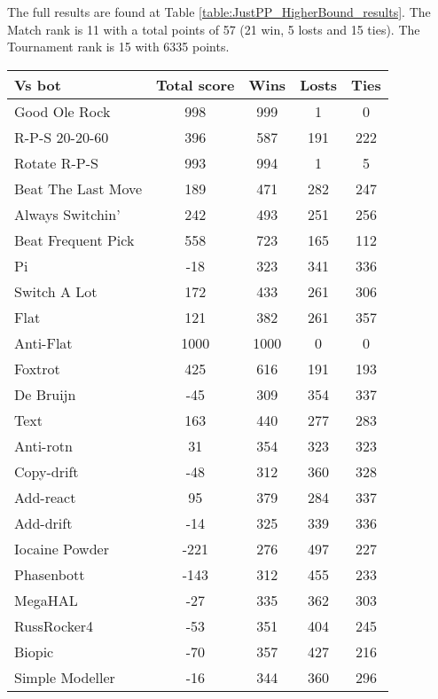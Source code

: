 The full results are found at Table \ref{table:JustPP_HigherBound_results}. The Match rank is 11 with a total points of 57 (21 win, 5 losts and 15 ties). The Tournament rank is 15 with 6335 points.

\begin{table*}
    \caption{JustPP_HigherBound results}
    \label{table:JustPP_HigherBound_results}
    \centering
    \begin{tabular}{|l|c|c|c|c|}
        \hline
        \textbf{Vs bot} & \textbf{Total score} & \textbf{Wins} & \textbf{Losts} & \textbf{Ties} \\ \hline
Good Ole Rock & 998 & 999 & 1 & 0 \\ \hline 
R-P-S 20-20-60 & 396 & 587 & 191 & 222 \\ \hline 
Rotate R-P-S & 993 & 994 & 1 & 5 \\ \hline 
Beat The Last Move & 189 & 471 & 282 & 247 \\ \hline 
Always Switchin' & 242 & 493 & 251 & 256 \\ \hline 
Beat Frequent Pick & 558 & 723 & 165 & 112 \\ \hline 
Pi & -18 & 323 & 341 & 336 \\ \hline 
Switch A Lot & 172 & 433 & 261 & 306 \\ \hline 
Flat & 121 & 382 & 261 & 357 \\ \hline 
Anti-Flat & 1000 & 1000 & 0 & 0 \\ \hline 
Foxtrot & 425 & 616 & 191 & 193 \\ \hline 
De Bruijn & -45 & 309 & 354 & 337 \\ \hline 
Text & 163 & 440 & 277 & 283 \\ \hline 
Anti-rotn & 31 & 354 & 323 & 323 \\ \hline 
Copy-drift & -48 & 312 & 360 & 328 \\ \hline 
Add-react & 95 & 379 & 284 & 337 \\ \hline 
Add-drift & -14 & 325 & 339 & 336 \\ \hline 
Iocaine Powder & -221 & 276 & 497 & 227 \\ \hline 
Phasenbott & -143 & 312 & 455 & 233 \\ \hline 
MegaHAL & -27 & 335 & 362 & 303 \\ \hline 
RussRocker4 & -53 & 351 & 404 & 245 \\ \hline 
Biopic & -70 & 357 & 427 & 216 \\ \hline 
Simple Modeller & -16 & 344 & 360 & 296 \\ \hline 

\end{tabular}
\end{table*}
